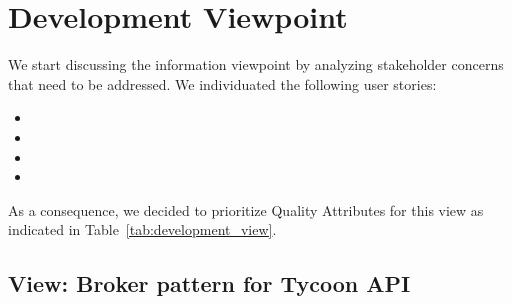 

\section{Development Viewpoint}
We start discussing the information viewpoint by analyzing stakeholder concerns that need to be addressed.
We individuated the following user stories:
\begin{itemize}
    \setlength{\itemsep}{0pt}
    \item \userStoryFour %
    \item \userStorySeven %
    \item \userStoryFourteen %
    \item \userStoryNine %
  \end{itemize}
  
As a consequence, we decided to prioritize Quality Attributes for this view as indicated in Table~\ref{tab:development_view}.
\begin{table}[h!]
    \centering
    \caption{Development View Prioritized Quality Attributes}
    \label{tab:development_view}
\end{table}

\subsection{View: Broker pattern for Tycoon API}
